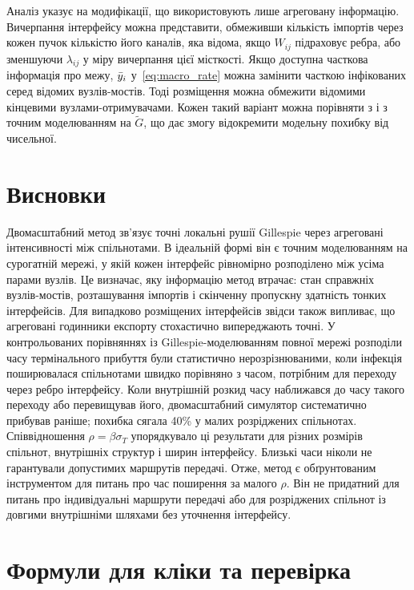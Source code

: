 Аналіз указує на модифікації, що використовують лише агреговану інформацію. Вичерпання інтерфейсу можна представити, обмеживши кількість імпортів через кожен пучок кількістю його каналів, яка відома, якщо $W_{ij}$ підраховує ребра, або зменшуючи $\lambda_{ij}$ у міру вичерпання цієї місткості. Якщо доступна часткова інформація про межу, $\bar{y}_i$ у~\eqref{eq:macro_rate} можна замінити часткою інфікованих серед відомих вузлів-мостів. Тоді розміщення можна обмежити відомими кінцевими вузлами-отримувачами. Кожен такий варіант можна порівняти з \Full{} і з точним моделюванням на $\tilde G$, що дає змогу відокремити модельну похибку від чисельної.

\clearpage
\section{Висновки}
\label{sec:conclusions}

Двомасштабний метод зв'язує точні локальні рушії Gillespie через агреговані інтенсивності між спільнотами. В ідеальній формі він є точним моделюванням на сурогатній мережі, у якій кожен інтерфейс рівномірно розподілено між усіма парами вузлів. Це визначає, яку інформацію метод втрачає: стан справжніх вузлів-мостів, розташування імпортів і скінченну пропускну здатність тонких інтерфейсів. Для випадково розміщених інтерфейсів звідси також випливає, що агреговані годинники експорту стохастично випереджають точні. У контрольованих порівняннях із Gillespie-моделюванням повної мережі розподіли часу термінального прибуття були статистично нерозрізнюваними, коли інфекція поширювалася спільнотами швидко порівняно з часом, потрібним для переходу через ребро інтерфейсу. Коли внутрішній розкид часу наближався до часу такого переходу або перевищував його, двомасштабний симулятор систематично прибував раніше; похибка сягала 40\% у малих розріджених спільнотах. Співвідношення $\rho=\beta\sigma_T$ упорядкувало ці результати для різних розмірів спільнот, внутрішніх структур і ширин інтерфейсу. Близькі часи ніколи не гарантували допустимих маршрутів передачі. Отже, метод є обґрунтованим інструментом для питань про час поширення за малого $\rho$. Він не придатний для питань про індивідуальні маршрути передачі або для розріджених спільнот із довгими внутрішніми шляхами без уточнення інтерфейсу.

\appendix

\clearpage
\section{Формули для кліки та перевірка}
\label{app:clique}

